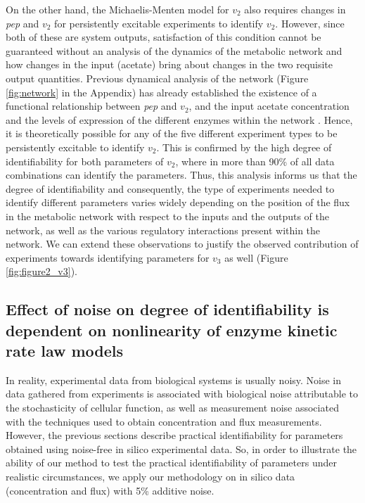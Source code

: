 \documentclass[10pt]{article}
\begin{document}
	On the other hand, the Michaelis-Menten model for $v_2$ also requires changes in \textit{pep} and $v_2$ for persistently excitable experiments to identify $v_2$. However, since both of these are system outputs, satisfaction of this condition cannot be guaranteed without an analysis of the dynamics of the metabolic network and how changes in the input (acetate) bring about changes in the two requisite output quantities. Previous dynamical analysis of the network (Figure \ref{fig:network} in the Appendix) has already established the existence of a functional relationship between \textit{pep} and $v_2$, and the input acetate concentration and the levels of expression of the different enzymes within the network \parencite{Srinivasan2017}. Hence, it is theoretically possible for any of the five different experiment types to be persistently excitable to identify $v_2$. This is confirmed by the high degree of identifiability for both parameters of $v_2$, where in more than 90\% of all data combinations can identify the parameters. Thus, this analysis informs us that the degree of identifiability and consequently, the type of experiments needed to identify different parameters varies widely depending on the position of the flux in the metabolic network with respect to the inputs and the outputs of the network, as well as the various regulatory interactions present within the network. We can extend these observations to justify the observed contribution of experiments towards identifying parameters for $v_3$ as well (Figure \ref{fig:figure2_v3}).	
	
	\subsection{Effect of noise on degree of identifiability is dependent on nonlinearity of enzyme kinetic rate law models}\label{sec:noise}
	In reality, experimental data from biological systems is usually noisy. Noise in data gathered from experiments is associated with biological noise attributable to the stochasticity of cellular function, as well as measurement noise associated with the techniques used to obtain concentration and flux measurements. However, the previous sections describe practical identifiability for parameters obtained using noise-free in silico experimental data. So, in order to illustrate the ability of our method to test the practical identifiability of parameters under realistic circumstances, we apply our methodology on in silico data (concentration and flux) with 5\% additive noise. 
	
\end{document}
